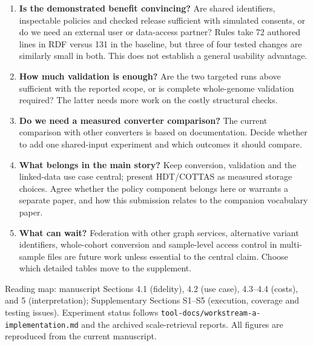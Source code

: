 \documentclass[11pt]{article}
\newcommand{\hd}[1]{\needspace{5\baselineskip}\vspace{7pt}{\large\bfseries\color{accent}#1}\par\vspace{2pt}}
\begin{document}
\hd{6. Decisions for the coauthors}
\begin{enumerate}[itemsep=9pt]
\item \textbf{Is the demonstrated benefit convincing?} Are shared identifiers,
inspectable policies and checked release sufficient with simulated consents, or
do we need an external user or data-access partner? Rules take 72 authored lines
in RDF versus 131 in the baseline, but three of four tested changes are similarly
small in both. This does not establish a general usability advantage.
\item \textbf{How much validation is enough?} Are the two targeted runs above
sufficient with the reported scope, or is complete whole-genome validation
required? The latter needs more work on the costly structural checks.
\item \textbf{Do we need a measured converter comparison?} The current comparison
with other converters is based on documentation. Decide whether to add one
shared-input experiment and which outcomes it should compare.
\item \textbf{What belongs in the main story?} Keep conversion, validation and the
linked-data use case central; present HDT/COTTAS as measured storage choices.
Agree whether the policy component belongs here or warrants a separate paper,
and how this submission relates to the companion vocabulary paper.
\item \textbf{What can wait?} Federation with other graph services, alternative
variant identifiers, whole-cohort conversion and sample-level access control
in multi-sample files are future work unless essential to the central claim.
Choose which detailed tables move to the supplement.
\end{enumerate}

\vfill
{\footnotesize\color{gray}\raggedright
Reading map: manuscript Sections 4.1 (fidelity), 4.2 (use case), 4.3--4.4
(costs), and 5 (interpretation); Supplementary Sections S1--S5 (execution,
coverage and testing issues). Experiment status follows
\nolinkurl{tool-docs/workstream-a-implementation.md} and the archived scale-retrieval
reports. All figures are reproduced from the current manuscript.\par}
\end{document}
